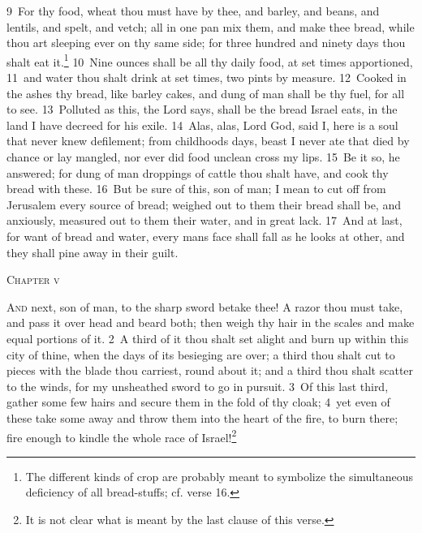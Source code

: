 \documentclass[10pt]{book} %
\begin{document}
\textcolor{benred8}{9}~For thy food, wheat thou must have by thee, and barley, and beans, and lentils, and spelt, and vetch; all in one pan mix them, and make thee bread, while thou art sleeping ever on thy same side; for three hundred and ninety days thou shalt eat it.\footnote[3]{The different kinds of crop are probably meant to symbolize the simultaneous deficiency of all bread-stuffs; cf. verse 16.} \textcolor{benred8}{10}~Nine ounces shall be all thy daily food, at set times apportioned, \textcolor{benred8}{11}~and water thou shalt drink at set times, two pints by measure. \textcolor{benred8}{12}~Cooked in the ashes thy bread, like barley cakes, and dung of man shall be thy fuel, for all to see. \textcolor{benred8}{13}~Polluted as this, the Lord says, shall be the bread Israel eats, in the land I have decreed for his exile.
\textcolor{benred8}{14}~Alas, alas, Lord God, said I, here is a soul that never knew defilement; from childhood\textquotesingle s days, beast I never ate that died by chance or lay mangled, nor ever did food unclean cross my lips. \textcolor{benred8}{15}~Be it so, he answered; for dung of man droppings of cattle thou shalt have, and cook thy bread with these. \textcolor{benred8}{16}~But be sure of this, son of man; I mean to cut off from Jerusalem every source of bread; weighed out to them their bread shall be, and anxiously, measured out to them their water, and in great lack. \textcolor{benred8}{17}~And at last, for want of bread and water, every man\textquotesingle s face shall fall as he looks at other, and they shall pine away in their guilt.
\begin{large}\begin{center}\textsc{Chapter v}\end{center}\end{large}
\lettrine[lines=2]{A}{nd} next, son of man, to the sharp sword betake thee! A razor thou must take, and pass it over head and beard both; then weigh thy hair in the scales and make equal portions of it. \textcolor{benred8}{2}~A third of it thou shalt set alight and burn up within this city of thine, when the days of its besieging are over; a third thou shalt cut to pieces with the blade thou carriest, round about it; and a third thou shalt scatter to the winds, for my unsheathed sword to go in pursuit. \textcolor{benred8}{3}~Of this last third, gather some few hairs and secure them in the fold of thy cloak; \textcolor{benred8}{4}~yet even of these take some away and throw them into the heart of the fire, to burn there; fire enough to kindle the whole race of Israel!\footnote[1]{It is not clear what is meant by the last clause of this verse.}
\end{document}
